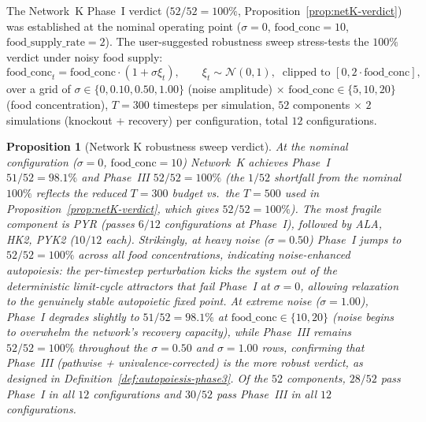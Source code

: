 \documentclass[11pt,a4paper]{article}
\theoremstyle{plain}
\newtheorem{proposition}[theorem]{Proposition}
\theoremstyle{definition}
\theoremstyle{remark}
\begin{document}
The Network~K Phase~I verdict ($52/52 = 100\%$,
Proposition~\ref{prop:netK-verdict}) was established at the nominal
operating point ($\sigma = 0$, $\mathrm{food\_conc} = 10$,
$\mathrm{food\_supply\_rate} = 2$). The user-suggested robustness
sweep stress-tests the $100\%$ verdict under noisy food supply:
\begin{equation}
\label{eq:food-noise}
\mathrm{food\_conc}_t = \mathrm{food\_conc} \cdot (1 + \sigma \xi_t),
\qquad \xi_t \sim \mathcal{N}(0, 1),\;\; \text{clipped to } [0, 2 \cdot \mathrm{food\_conc}],
\end{equation}
over a grid of $\sigma \in \{0, 0.10, 0.50, 1.00\}$ (noise amplitude)
$\times$ $\mathrm{food\_conc} \in \{5, 10, 20\}$ (food concentration),
$T = 300$ timesteps per simulation, $52$ components $\times$ $2$
simulations (knockout + recovery) per configuration, total
$12$ configurations.

\begin{proposition}[Network K robustness sweep verdict]
\label{prop:netK-robust}
At the nominal configuration ($\sigma = 0$, $\mathrm{food\_conc} =
10$) Network~K achieves Phase~I $51/52 = 98.1\%$ and Phase~III
$52/52 = 100\%$ (the $1/52$ shortfall from the nominal $100\%$
reflects the reduced $T = 300$ budget vs.~the $T = 500$ used in
Proposition~\ref{prop:netK-verdict}, which gives $52/52 = 100\%$).
The most fragile component is PYR (passes $6/12$ configurations at
Phase~I), followed by ALA, HK2, PYK2 ($10/12$ each). Strikingly,
at heavy noise ($\sigma = 0.50$) Phase~I jumps to $52/52 = 100\%$
across \emph{all} food concentrations, indicating noise-enhanced
autopoiesis: the per-timestep perturbation kicks the system out of
the deterministic limit-cycle attractors that fail Phase~I at
$\sigma = 0$, allowing relaxation to the genuinely stable autopoietic
fixed point. At extreme noise ($\sigma = 1.00$), Phase~I degrades
slightly to $51/52 = 98.1\%$ at $\mathrm{food\_conc} \in \{10, 20\}$
(noise begins to overwhelm the network's recovery capacity), while
Phase~III remains $52/52 = 100\%$ throughout the $\sigma = 0.50$
and $\sigma = 1.00$ rows, confirming that Phase~III (pathwise +
univalence-corrected) is the more robust verdict, as designed in
Definition~\ref{def:autopoiesis-phase3}. Of the $52$ components,
$28/52$ pass Phase~I in all $12$ configurations and $30/52$ pass
Phase~III in all $12$ configurations.
\end{proposition}
\end{document}
